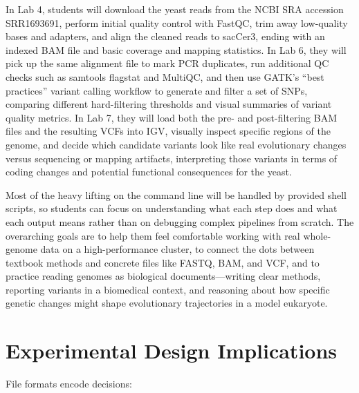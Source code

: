 \documentclass[
  letterpaper,
  DIV=11,
  numbers=noendperiod]{scrreprt}
\begin{document}
In Lab 4, students will download the yeast reads from the NCBI SRA
accession SRR1693691, perform initial quality control with FastQC, trim
away low-quality bases and adapters, and align the cleaned reads to
sacCer3, ending with an indexed BAM file and basic coverage and mapping
statistics. In Lab 6, they will pick up the same alignment file to mark
PCR duplicates, run additional QC checks such as samtools flagstat and
MultiQC, and then use GATK's ``best practices'' variant calling workflow
to generate and filter a set of SNPs, comparing different hard-filtering
thresholds and visual summaries of variant quality metrics. In Lab 7,
they will load both the pre- and post-filtering BAM files and the
resulting VCFs into IGV, visually inspect specific regions of the
genome, and decide which candidate variants look like real evolutionary
changes versus sequencing or mapping artifacts, interpreting those
variants in terms of coding changes and potential functional
consequences for the yeast.\hspace{0pt}\hspace{0pt}

Most of the heavy lifting on the command line will be handled by
provided shell scripts, so students can focus on understanding what each
step does and what each output means rather than on debugging complex
pipelines from scratch. The overarching goals are to help them feel
comfortable working with real whole-genome data on a high-performance
cluster, to connect the dots between textbook methods and concrete files
like FASTQ, BAM, and VCF, and to practice reading genomes as biological
documents---writing clear methods, reporting variants in a biomedical
context, and reasoning about how specific genetic changes might shape
evolutionary trajectories in a model eukaryote.\hspace{0pt}\hspace{0pt}

\section{Experimental Design
Implications}\label{experimental-design-implications}

File formats encode decisions:
\end{document}
